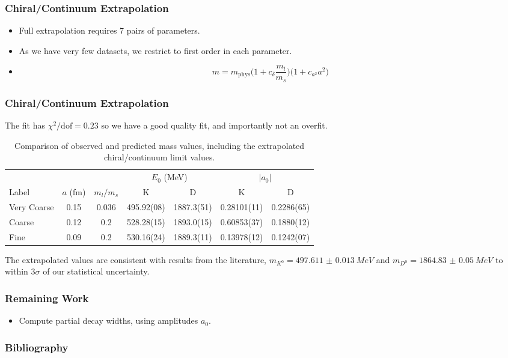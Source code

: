 \documentclass{beamer}
\begin{document}
\begin{frame}
    \frametitle{Chiral/Continuum Extrapolation}
    \begin{itemize}
        \item Full extrapolation\cite{chakraborty2017nonperturbative} requires 7 pairs of parameters.
        \item As we have very few datasets, we restrict to first order in each parameter. 
        \item[]
        \begin{equation*}
            m = m_\mathrm{phys} \Big(1 + c_\delta \frac{m_l}{m_s}\Big)\Big(1 + c_{a^2} a^2\Big)
        \end{equation*}
    \end{itemize}
\end{frame}

\begin{frame}
    \frametitle{Chiral/Continuum Extrapolation}
    The fit has $\chi^2 / \mathrm{dof} = 0.23$ so we have a good quality fit, and importantly not an overfit.
    \begin{table}
    \centering
    \tiny
    \begin{tabular}{l S[table-format=1.2] S[table-format=1.3] S[table-format=3.2(2)] S[table-format=4.1(2)] S[table-format=1.5(2)] S[table-format=1.4(2)]}
        \toprule
                    &                   &                   &        & \\
        \cmidrule(lr){4-5}\cmidrule(lr){6-7}
        Label       & {$a$ (\si{fm})}   & {$m_l / m_s$}     & {K}               & {D}               & {K}                & {D}\\
        \midrule
        Very Coarse & 0.15              & 0.036             & 495.92(08)        & 1887.3(51)        & 0.28101(11)        & 0.2286(65)\\
        Coarse      & 0.12              & 0.2               & 528.28(15)        & 1893.0(15)        & 0.60853(37)        & 0.1880(12)\\
        Fine        & 0.09              & 0.2               & 530.16(24)        & 1889.3(11)        & 0.13978(12)        & 0.1242(07)\\
        \bottomrule
    \end{tabular}
    \normalsize
    \caption{Comparison of observed and predicted mass values, including the extrapolated chiral/continuum limit values.\label{table:extrapolated_mass}}
    \end{table}
    The extrapolated values are consistent with results from the literature\cite{zyla2020review}, $m_{K^0} = \SI{497.611(13)}{MeV}$ and $m_{D^0} = \SI{1864.83(5)}{MeV}$ to within $3\sigma$ of our statistical uncertainty.
\end{frame}

\begin{frame}
    \frametitle{Remaining Work}
    \begin{itemize}
        \item Compute partial decay widths, using amplitudes $a_0$.
    \end{itemize}
\end{frame}

\begin{frame}
\frametitle{Bibliography}
\renewcommand*{\bibfont}{\tiny}
\printbibliography[heading=none]
\end{frame}
\end{document}
